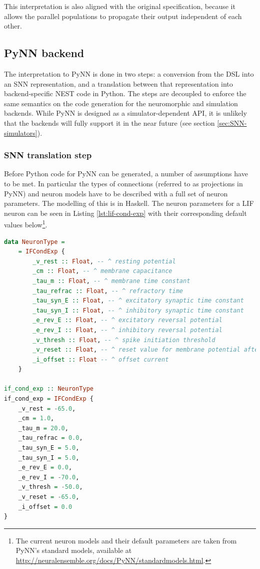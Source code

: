This interpretation is also aligned with the original specification, 
because it allows the parallel populations to propagate their output
independent of each other.

\subsection{PyNN backend}
The interpretation to PyNN is done in two steps: a
conversion from the \gls{DSL} into an \gls{SNN} representation,
and a translation between that representation into backend-specific
NEST code in Python. 
The steps are decoupled to enforce the same semantics on the code
generation for the neuromorphic and simulation backends.
While PyNN is designed as a simulator-dependent \gls{API}, 
it is unlikely that the backends will fully support it in the
near future (see section \ref{sec:SNN-simulators}).

\subsubsection{\gls{SNN} translation step}
Before Python code for PyNN can be generated, a number of assumptions
have to be met. 
In particular the types of connections (referred to as projections in PyNN)
and neuron models have to be described with a full set of neuron parameters.
The modelling of this is in Haskell.
The neuron parameters for a LIF neuron can be seen in Listing
\ref{lst:lif-cond-exp} with their corresponding default values
below\footnote{
The current neuron models and their default parameters are taken from PyNN's
standard models, available at
\url{http://neuralensemble.org/docs/PyNN/standardmodels.html}.
}.

\begin{lstlisting}[language=Haskell,caption={A LIF neuron with exponential decay and
  conductance-based synapses, modelled in Haskell.},label={lst:lif-cond-exp}]
data NeuronType =
    = IFCondExp {
        _v_rest :: Float, -- ^ resting potential
        _cm :: Float, -- ^ membrane capacitance
        _tau_m :: Float, -- ^ membrane time constant
        _tau_refrac :: Float, -- ^ refractory time
        _tau_syn_E :: Float, -- ^ excitatory synaptic time constant
        _tau_syn_I :: Float, -- ^ inhibitory synaptic time constant
        _e_rev_E :: Float, -- ^ excitatory reversal potential
        _e_rev_I :: Float, -- ^ inhibitory reversal potential
        _v_thresh :: Float, -- ^ spike initiation threshold
        _v_reset :: Float, -- ^ reset value for membrane potential after a spike
        _i_offset :: Float -- ^ offset current
    }

if_cond_exp :: NeuronType
if_cond_exp = IFCondExp {
    _v_rest = -65.0,
    _cm = 1.0,
    _tau_m = 20.0,
    _tau_refrac = 0.0,
    _tau_syn_E = 5.0,
    _tau_syn_I = 5.0,
    _e_rev_E = 0.0,
    _e_rev_I = -70.0,
    _v_thresh = -50.0,
    _v_reset = -65.0,
    _i_offset = 0.0
}
\end{lstlisting}

